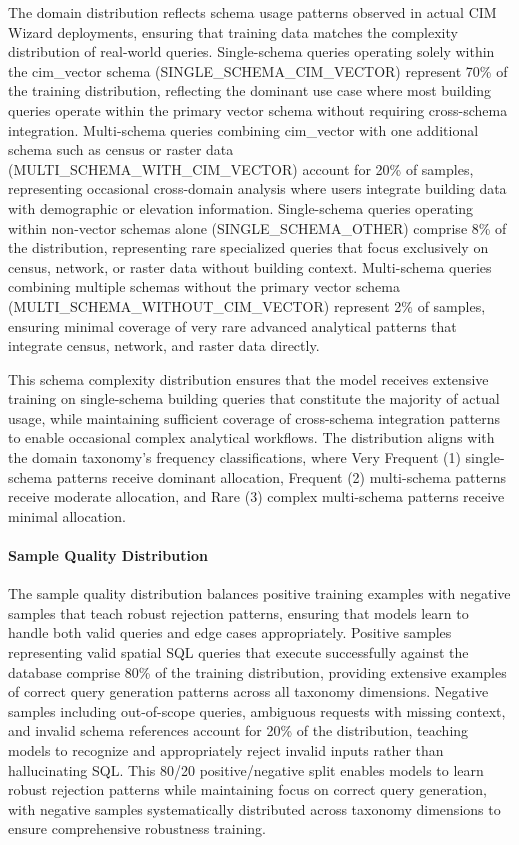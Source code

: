 The domain distribution reflects schema usage patterns observed in actual CIM Wizard deployments, ensuring that training data matches the complexity distribution of real-world queries. Single-schema queries operating solely within the cim\_vector schema (SINGLE\_SCHEMA\_CIM\_VECTOR) represent 70\% of the training distribution, reflecting the dominant use case where most building queries operate within the primary vector schema without requiring cross-schema integration. Multi-schema queries combining cim\_vector with one additional schema such as census or raster data (MULTI\_SCHEMA\_WITH\_CIM\_VECTOR) account for 20\% of samples, representing occasional cross-domain analysis where users integrate building data with demographic or elevation information. Single-schema queries operating within non-vector schemas alone (SINGLE\_SCHEMA\_OTHER) comprise 8\% of the distribution, representing rare specialized queries that focus exclusively on census, network, or raster data without building context. Multi-schema queries combining multiple schemas without the primary vector schema (MULTI\_SCHEMA\_WITHOUT\_CIM\_VECTOR) represent 2\% of samples, ensuring minimal coverage of very rare advanced analytical patterns that integrate census, network, and raster data directly.

This schema complexity distribution ensures that the model receives extensive training on single-schema building queries that constitute the majority of actual usage, while maintaining sufficient coverage of cross-schema integration patterns to enable occasional complex analytical workflows. The distribution aligns with the domain taxonomy's frequency classifications, where Very Frequent (1) single-schema patterns receive dominant allocation, Frequent (2) multi-schema patterns receive moderate allocation, and Rare (3) complex multi-schema patterns receive minimal allocation.

\paragraph{Sample Quality Distribution}

The sample quality distribution balances positive training examples with negative samples that teach robust rejection patterns, ensuring that models learn to handle both valid queries and edge cases appropriately. Positive samples representing valid spatial SQL queries that execute successfully against the database comprise 80\% of the training distribution, providing extensive examples of correct query generation patterns across all taxonomy dimensions. Negative samples including out-of-scope queries, ambiguous requests with missing context, and invalid schema references account for 20\% of the distribution, teaching models to recognize and appropriately reject invalid inputs rather than hallucinating SQL. This 80/20 positive/negative split enables models to learn robust rejection patterns while maintaining focus on correct query generation, with negative samples systematically distributed across taxonomy dimensions to ensure comprehensive robustness training.

